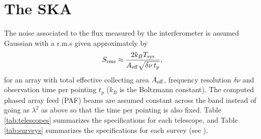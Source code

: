 \documentclass[useAMS,usenatbib]{mn2e}
\begin{document}
\section*{The SKA}




The noise associated to the flux measured by the interferometer is assumed Gaussian with a r.m.s given approximately by
\begin{equation}
S_{\rm{rms}} \approx \frac{2 k_B T_{\rm sys}}{A_{\rm eff} \sqrt{\delta\nu\, t_p}},
\end{equation}
for an array with total effective collecting area $A_{\rm eff}$, frequency resolution $\delta\nu$ and observation time per pointing $t_p$ ($k_B$ is the Boltzmann constant). 
The computed phased array feed (PAF) beams are assumed constant across the band instead of going as $\lambda^2$ as above so that the time per pointing is also fixed. Table \ref{tab:telescopes} summarizes the specifications for each telescope, and Table \ref{tab:surveys} summarizes the specifications for each survey (see \cite{Bull:2014rha}).
\end{document}
